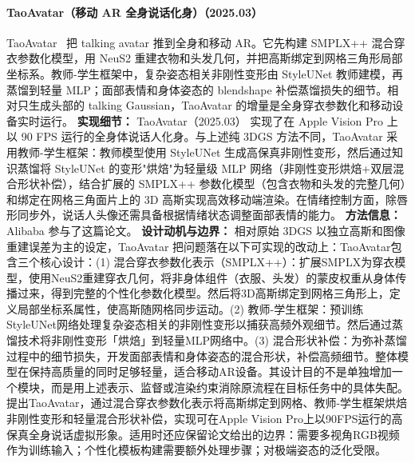 \paragraph{TaoAvatar（移动 AR 全身说话化身）（2025.03）}
TaoAvatar~\cite{2503_17032} 把 talking avatar 推到全身和移动 AR。它先构建 SMPLX++ 混合穿衣参数化模型，用 NeuS2 重建衣物和头发几何，并把高斯绑定到网格三角形局部坐标系。教师-学生框架中，复杂姿态相关非刚性变形由 StyleUNet 教师建模，再蒸馏到轻量 MLP；面部表情和身体姿态的 blendshape 补偿蒸馏损失的细节。相对只生成头部的 talking Gaussian，TaoAvatar 的增量是全身穿衣参数化和移动设备实时运行。
\textbf{实现细节：} TaoAvatar（2025.03） 实现了在 Apple Vision Pro 上以 90 FPS 运行的全身体说话人化身。与上述纯 3DGS 方法不同，TaoAvatar 采用教师-学生框架：教师模型使用 StyleUNet 生成高保真非刚性变形，然后通过知识蒸馏将 StyleUNet 的变形"烘焙"为轻量级 MLP 网络（非刚性变形烘焙+双层混合形状补偿），结合扩展的 SMPLX++ 参数化模型（包含衣物和头发的完整几何）和绑定在网格三角面片上的 3D 高斯实现高效移动端渲染。在情绪控制方面，除唇形同步外，说话人头像还需具备根据情绪状态调整面部表情的能力。
\textbf{方法信息：} Alibaba 参与了这篇论文。
\textbf{设计动机与边界：} 相对原始 3DGS 以独立高斯和图像重建误差为主的设定，TaoAvatar 把问题落在以下可实现的改动上：TaoAvatar包含三个核心设计：(1) 混合穿衣参数化表示（SMPLX++）：扩展SMPLX为穿衣模型，使用NeuS2重建穿衣几何，将非身体组件（衣服、头发）的蒙皮权重从身体传播过来，得到完整的个性化参数化模型。然后将3D高斯绑定到网格三角形上，定义局部坐标系属性，使高斯随网格同步运动。(2) 教师-学生框架：预训练StyleUNet网络处理复杂姿态相关的非刚性变形以捕获高频外观细节。然后通过蒸馏技术将非刚性变形「烘焙」到轻量MLP网络中。(3) 混合形状补偿：为弥补蒸馏过程中的细节损失，开发面部表情和身体姿态的混合形状，补偿高频细节。整体模型在保持高质量的同时足够轻量，适合移动AR设备。其设计目的不是单独增加一个模块，而是用上述表示、监督或渲染约束消除原流程在目标任务中的具体失配。提出TaoAvatar，通过混合穿衣参数化表示将高斯绑定到网格、教师-学生框架烘焙非刚性变形和轻量混合形状补偿，实现可在Apple Vision Pro上以90FPS运行的高保真全身说话虚拟形象。适用时还应保留论文给出的边界：需要多视角RGB视频作为训练输入；个性化模板构建需要额外处理步骤；对极端姿态的泛化受限。

